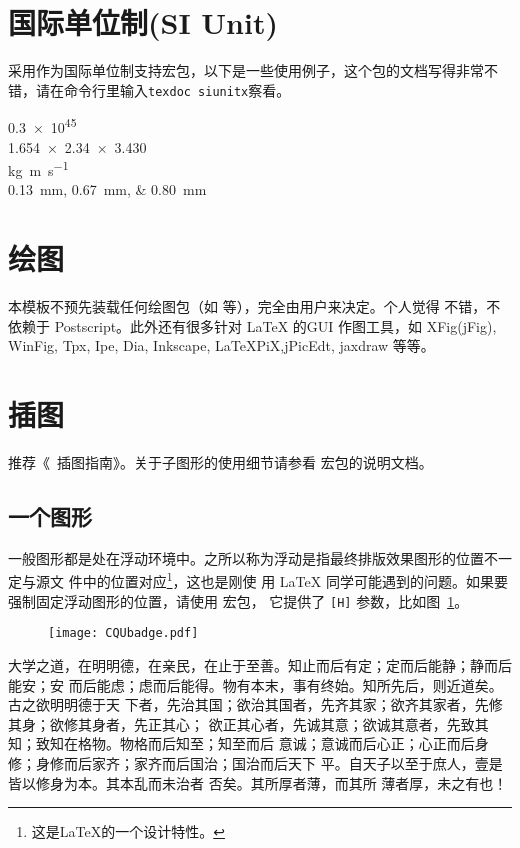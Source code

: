 \section{国际单位制(SI Unit)}

\PRCthesis 采用作为国际单位制支持宏包，以下是一些使用例子，这个包的文档写得非常不错，请在命令行里输入\texttt{texdoc siunitx}察看。
\begin{center}
	\num{.3e45}\\
	\num{1.654 x 2.34 x 3.430}\\
	\si{\kilogram\metre\per\second}\\    
	\SIlist{0.13;0.67;0.80}{\milli\metre}
\end{center}


\section{绘图}
\label{sec:draw}

本模板不预先装载任何绘图包（如  等），完全由用户来决定。个人觉得  不错，不依赖于 Postscript。此外还有很多针对 \LaTeX{} 的GUI 作图工具，如 XFig(jFig), WinFig, Tpx, Ipe, Dia, Inkscape, LaTeXPiX,jPicEdt, jaxdraw 等等。

\section{插图}
\label{sec:graphs}

推荐《\LaTeXe\ 插图指南》。关于子图形的使用细节请参看  宏包的说明文档。

\subsection{一个图形}
\label{sec:onefig}
一般图形都是处在浮动环境中。之所以称为浮动是指最终排版效果图形的位置不一定与源文
件中的位置对应\footnote{这是\LaTeX 的一个设计特性。}，这也是刚使
用 \LaTeX{} 同学可能遇到的问题。如果要强制固定浮动图形的位置，请使用  宏包，
它提供了 \texttt{[H]} 参数，比如图~\ref{fig:xfig1}。
\begin{figure}[htb] %
	\centering
	\texttt{[image: CQUbadge.pdf]}
	\label{fig:xfig1}
\end{figure}

大学之道，在明明德，在亲民，在止于至善。知止而后有定；定而后能静；静而后能安；安
而后能虑；虑而后能得。物有本末，事有终始。知所先后，则近道矣。古之欲明明德于天
下者，先治其国；欲治其国者，先齐其家；欲齐其家者，先修其身；欲修其身者，先正其心；
欲正其心者，先诚其意；欲诚其意者，先致其知；致知在格物。物格而后知至；知至而后
意诚；意诚而后心正；心正而后身 修；身修而后家齐；家齐而后国治；国治而后天下
平。自天子以至于庶人，壹是皆以修身为本。其本乱而未治者 否矣。其所厚者薄，而其所
薄者厚，未之有也！

